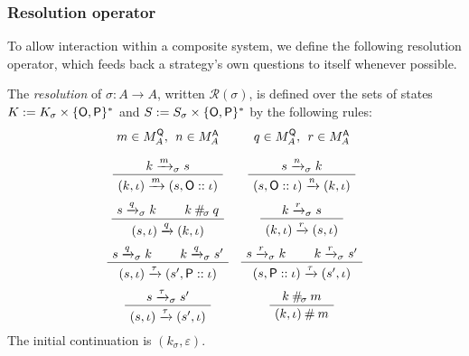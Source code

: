 
\subsubsection{Resolution operator} %

To allow interaction within a composite system,
we define the following resolution operator,
which feeds back a strategy's own questions to itself
whenever possible.

\begin{definition} %
The \emph{resolution} of $\sigma : A \rightarrow A$,
written $\mathcal{R}(\sigma)$,
is defined over the sets of states
$K := K_\sigma \times \{ \mathsf{O} ,  \mathsf{P} \}^*$ and
$S := S_\sigma \times \{ \mathsf{O} ,  \mathsf{P} \}^*$
by the following rules:
\[
  \begin{array}{cc}
    {\small m \in M_A^\kw{Q}, \:\: n \in M_A^\kw{A}}
    &
    {\small q \in M_A^\kw{Q}, \:\: r \in M_A^\kw{A}}
    \\[1em]
    \AxiomC{$k \xrightarrow{m}_\sigma s$}
    \UnaryInfC{$(k, \iota) \xrightarrow{m} (s, \kw{O} :: \iota)$}
    \DisplayProof
    &
    \AxiomC{$s \xrightarrow{n}_\sigma k$}
    \UnaryInfC{$(s, \kw{O} :: \iota) \xrightarrow{n} (k, \iota)$}
    \DisplayProof
    \\[1.5em]
    \AxiomC{$s \xrightarrow{q}_\sigma k$}
    \AxiomC{$k \:\#_{\!\sigma}\: q$}
    \BinaryInfC{$(s, \iota) \xrightarrow{q} (k, \iota)$}
    \DisplayProof
    &
    \AxiomC{$k \xrightarrow{r}_\sigma s$}
    \UnaryInfC{$(k, \iota) \xrightarrow{r} (s, \iota)$}
    \DisplayProof
    \\[1.5em]
    \AxiomC{$s \xrightarrow{q}_\sigma k$}
    \AxiomC{$k \xrightarrow{q}_\sigma s'$}
    \BinaryInfC{$(s, \iota) \xrightarrow{\tau} (s', \kw{P} :: \iota)$}
    \DisplayProof
    &
    \AxiomC{$s \xrightarrow{r}_\sigma k$}
    \AxiomC{$k \xrightarrow{r}_\sigma s'$}
    \BinaryInfC{$(s, \kw{P} :: \iota) \xrightarrow{\tau} (s', \iota)$}
    \DisplayProof
    \\[1.5em]
    \AxiomC{$s \xrightarrow{\tau}_\sigma s'$}
    \UnaryInfC{$(s, \iota) \xrightarrow{\tau} (s', \iota)$}
    \DisplayProof
    &
    \AxiomC{$k \:\#_{\!\sigma}\: m$}
    \UnaryInfC{$(k, \iota) \:\#\: m$}
    \DisplayProof
  \end{array}
\]
The initial continuation is $(k_{\sigma}, \varepsilon)$.
\end{definition}

